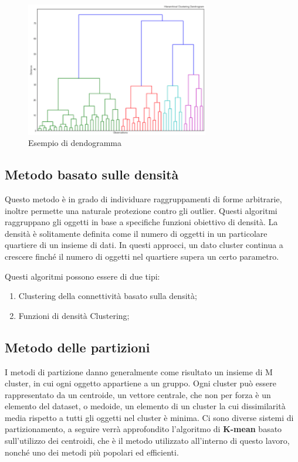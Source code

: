\begin{figure}[h]
	\includegraphics[width=8cm]{capitolo3/dendo.png}
	\centering
	\caption{Esempio di dendogramma}
	\label{fig:dendo}
\end{figure}


\subsection{Metodo basato sulle densità}

Questo metodo è in grado di individuare raggruppamenti di forme arbitrarie, inoltre permette una naturale protezione contro gli outlier. Questi algoritmi raggruppano gli oggetti in base a specifiche funzioni obiettivo di densità. La densità è solitamente definita come il numero di oggetti in un particolare quartiere di un insieme di dati. In questi approcci, un dato cluster continua a crescere finché il numero di oggetti nel quartiere supera un certo parametro.

Questi algoritmi possono essere di due tipi:
\begin{enumerate}
	\item Clustering della connettività basato sulla densità;
	\item Funzioni di densità Clustering;
\end{enumerate}

\subsection{Metodo delle partizioni}

I metodi di partizione danno generalmente come risultato un insieme di M cluster, in cui ogni oggetto appartiene a un gruppo.
Ogni cluster può essere rappresentato da un centroide, un vettore centrale, che non per forza è un elemento del dataset, o medoide, un elemento di un cluster la cui dissimilarità media rispetto a tutti gli oggetti nel cluster è minima. 
Ci sono diverse sistemi di partizionamento, a seguire verrà approfondito l'algoritmo di \textbf{K-mean} basato sull'utilizzo dei centroidi, che è il metodo utilizzato all'interno di questo lavoro, nonché uno dei metodi più popolari ed efficienti\cite{rai2010survey}.





